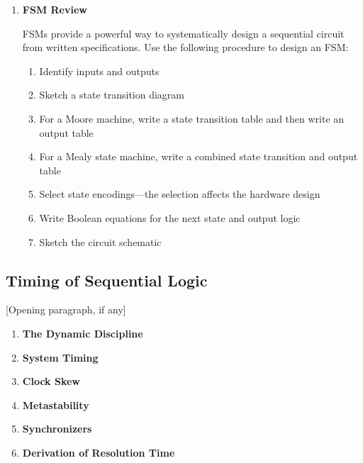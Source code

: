 \documentclass[12pt]{article}
\begin{document}
\begin{enumerate}
  \item \textbf{FSM Review}

  FSMs provide a powerful way to systematically design a sequential circuit from written specifications. Use the following procedure to design an FSM:

  \begin{enumerate}
    \item Identify inputs and outputs
    \item Sketch a state transition diagram
    \item For a Moore machine, write a state transition table and then write an output table
    \item For a Mealy state machine, write a combined state transition and output table
    \item Select state encodings---the selection affects the hardware design
    \item Write Boolean equations for the next state and output logic
    \item Sketch the circuit schematic
  \end{enumerate}
\end{enumerate}

\subsection{Timing of Sequential Logic}

[Opening paragraph, if any]

\begin{enumerate}
  \item \textbf{The Dynamic Discipline}

  \item \textbf{System Timing}

  \item \textbf{Clock Skew}

  \item \textbf{Metastability}

  \item \textbf{Synchronizers}

  \item \textbf{Derivation of Resolution Time}
\end{enumerate}
\end{document}
